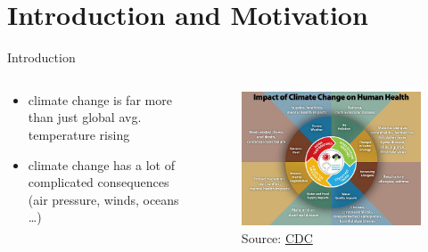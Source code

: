 \section[Intro]{Introduction and Motivation}
\begin{frame}{Introduction}
\begin{columns}
  \begin{column}{.5 \textwidth}
    \begin{itemize}
      \item climate change is far more than just global avg. temperature rising 
      \item climate change has a lot of complicated consequences (air pressure, winds, oceans \dots)  
    \end{itemize}
    
    
  \end{column}
  \begin{column}{.5 \textwidth}
    \begin{figure}[t]
      \centering
      \includegraphics[width=.9 \columnwidth]{imglib/climate_change_health_impacts.jpg}
      {\tiny
        Source: \href{https://www.cdc.gov/climateandhealth/effects/default.htm}{CDC} 
      }    
    \end{figure}
    
  \end{column}
  
\end{columns}
\end{frame}

